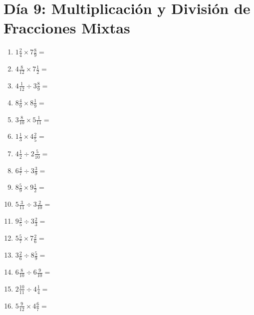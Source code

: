 \documentclass[12pt]{article}
\begin{document}
\section*{Día 9: Multiplicación y División de Fracciones Mixtas}
\begin{enumerate}
\item \large $ 1 \frac{2}{4} \times 7 \frac{8}{9} = $ \vspace{1.6cm}
\item \large $ 4 \frac{8}{12} \times 7 \frac{1}{2} = $ \vspace{1.6cm}
\item \large $ 4 \frac{1}{12} \div 3 \frac{8}{9} = $ \vspace{1.6cm}
\item \large $ 8 \frac{4}{9} \times 8 \frac{1}{9} = $ \vspace{1.6cm}
\item \large $ 3 \frac{8}{10} \times 5 \frac{1}{11} = $ \vspace{1.6cm}
\item \large $ 1 \frac{1}{3} \times 4 \frac{2}{5} = $ \vspace{1.6cm}
\item \large $ 4 \frac{1}{2} \div 2 \frac{5}{10} = $ \vspace{1.6cm}
\item \large $ 6 \frac{4}{7} \div 3 \frac{3}{9} = $ \vspace{1.6cm}
\item \large $ 8 \frac{5}{9} \times 9 \frac{1}{2} = $ \vspace{1.6cm}
\item \large $ 5 \frac{3}{11} \div 3 \frac{2}{10} = $ \vspace{1.6cm}
\newpage
\item \large $ 9 \frac{3}{5} \div 3 \frac{2}{3} = $ \vspace{1.6cm}
\item \large $ 5 \frac{5}{7} \times 7 \frac{2}{6} = $ \vspace{1.6cm}
\item \large $ 3 \frac{2}{6} \div 8 \frac{5}{9} = $ \vspace{1.6cm}
\item \large $ 6 \frac{8}{10} \div 6 \frac{9}{10} = $ \vspace{1.6cm}
\item \large $ 2 \frac{10}{11} \div 4 \frac{1}{4} = $ \vspace{1.6cm}
\item \large $ 5 \frac{9}{12} \times 4 \frac{6}{7} = $ \vspace{1.6cm}

\end{enumerate}
\end{document}
